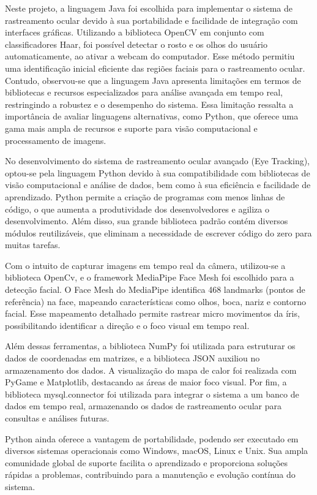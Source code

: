 Neste projeto, a linguagem Java foi escolhida para implementar o sistema de rastreamento ocular devido à sua portabilidade e facilidade de integração com interfaces gráficas. Utilizando a biblioteca OpenCV em conjunto com classificadores Haar, foi possível detectar o rosto e os olhos do usuário automaticamente, ao ativar a webcam do computador. Esse método permitiu uma identificação inicial eficiente das regiões faciais para o rastreamento ocular. Contudo, observou-se que a linguagem Java apresenta limitações em termos de bibliotecas e recursos especializados para análise avançada em tempo real, restringindo a robustez e o desempenho do sistema. Essa limitação ressalta a importância de avaliar linguagens alternativas, como Python, que oferece uma gama mais ampla de recursos e suporte para visão computacional e processamento de imagens.

No desenvolvimento do sistema de rastreamento ocular avançado (Eye Tracking), optou-se pela linguagem Python devido à sua compatibilidade com bibliotecas de visão computacional e análise de dados, bem como à sua eficiência e facilidade de aprendizado. Python permite a criação de programas com menos linhas de código, o que aumenta a produtividade dos desenvolvedores e agiliza o desenvolvimento. Além disso, sua grande biblioteca padrão contém diversos módulos reutilizáveis, que eliminam a necessidade de escrever código do zero para muitas tarefas. \textcite{Amazon}

Com o intuito de capturar imagens em tempo real da câmera, utilizou-se a biblioteca OpenCv, e o framework MediaPipe Face Mesh foi escolhido para a detecção facial. O Face Mesh do MediaPipe identifica 468 landmarks (pontos de referência) na face, mapeando características como olhos, boca, nariz e contorno facial. Esse mapeamento detalhado permite rastrear micro movimentos da íris, possibilitando identificar a direção e o foco visual em tempo real.

Além dessas ferramentas, a biblioteca NumPy foi utilizada para estruturar os dados de coordenadas em matrizes, e a biblioteca JSON auxiliou no armazenamento dos dados. A visualização do mapa de calor foi realizada com PyGame e Matplotlib, destacando as áreas de maior foco visual. Por fim, a biblioteca mysql.connector foi utilizada para integrar o sistema a um banco de dados em tempo real, armazenando os dados de rastreamento ocular para consultas e análises futuras.

Python ainda oferece a vantagem de portabilidade, podendo ser executado em diversos sistemas operacionais como Windows, macOS, Linux e Unix. Sua ampla comunidade global de suporte facilita o aprendizado e proporciona soluções rápidas a problemas, contribuindo para a manutenção e evolução contínua do sistema. \textcite{Amazon}

